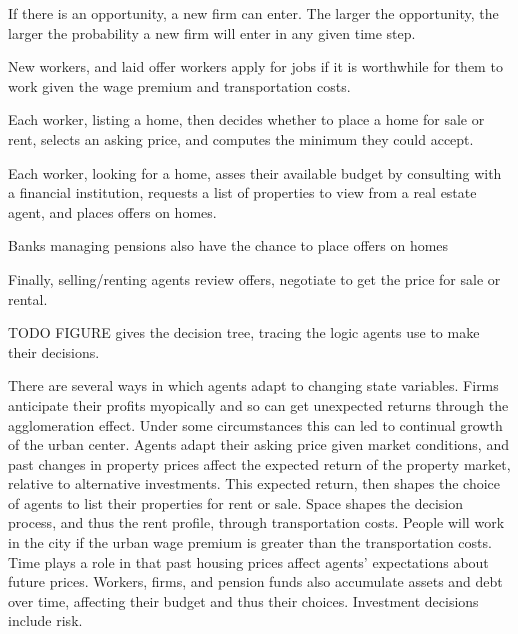 If there is an opportunity, a new firm can enter. The larger the opportunity, the larger the probability a new firm will enter in any given time step. 

New workers, and laid offer workers apply for jobs if it is worthwhile for them to work given the wage premium and transportation costs. 

Each worker, listing a home, then decides whether to place a home for sale or rent, selects an asking price, and computes the minimum they could accept.

Each worker, looking for a home, asses their available budget by consulting with a financial institution, requests a list of properties to view from a real estate agent, and places offers on homes.

Banks managing pensions also have the chance to place offers on homes %

Finally, selling/renting agents review offers, negotiate to get the price for sale or rental. %

TODO FIGURE gives the decision tree, tracing the logic agents use to make their decisions.

There are several ways in which agents adapt to changing state variables. 
Firms anticipate their profits myopically and so can get unexpected returns through the agglomeration effect. Under some circumstances this can led to continual growth of the urban center.
Agents adapt their asking price given market conditions, and past changes in property prices affect the expected return of the property market, relative to alternative investments. This expected return, then shapes the choice of agents to list their properties for rent or sale.   %
Space shapes the decision process, and thus the rent profile, through transportation costs. People will work in the city if the urban wage premium is greater than the transportation costs. %
Time plays a role in that past housing prices affect agents' expectations about future prices. %
Workers, firms, and pension funds also accumulate assets and debt over time, affecting their budget and thus their choices. %
Investment decisions include risk. %


